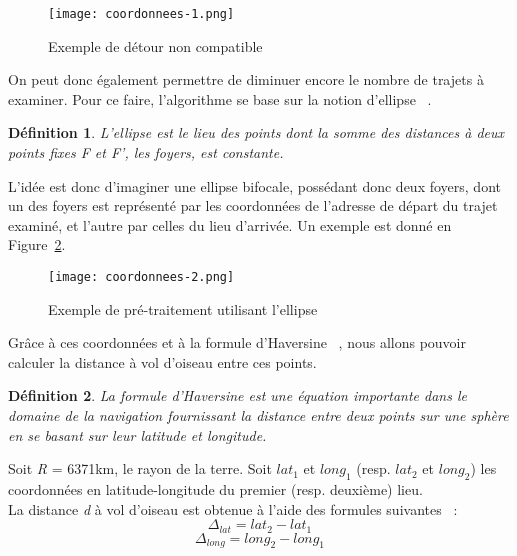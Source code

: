\documentclass[12pt, a4paper, oneside]{article}
\newtheorem{defi}{D\'efinition}[section]
\begin{document}
    \begin{figure}[!htb]
        \begin{center}
         \texttt{[image: coordonnees-1.png]}
         \caption{Exemple de détour non compatible}
         \label{coordonnees-1}
        \end{center}
       \end{figure}
       On peut donc également permettre de diminuer encore le nombre de trajets à examiner. Pour ce faire, l'algorithme se base sur la notion d'ellipse ~\cite{ellipse}.
    \begin{defi}
        L'ellipse est le lieu des points dont la somme des distances à deux points fixes F et F', les foyers, est constante.
    \end{defi}
     L'idée est donc d'imaginer une ellipse bifocale, possédant donc deux foyers, dont un des foyers est représenté par les coordonnées de l'adresse de départ du trajet examiné, et l'autre par celles du lieu d'arrivée. Un exemple est donné en Figure~\ref{coordonnees-2}.
     \begin{figure}[!htb]
      \begin{center}
       \texttt{[image: coordonnees-2.png]}
       \caption{Exemple de pré-traitement utilisant l'ellipse}
       \label{coordonnees-2}
      \end{center}
     \end{figure}
      Grâce à ces coordonnées et à la formule d'Haversine ~\cite{haversine}, nous allons pouvoir calculer la distance à vol d'oiseau entre ces points. 
     \begin{defi}
         La formule d'Haversine est une équation importante dans le domaine de la navigation fournissant la distance entre deux points sur une sphère en se basant sur leur latitude et longitude.
     \end{defi}
     \noindent Soit \textit{R} = 6371km, le rayon de la terre. Soit \textit{$lat_{1}$} et \textit{$long_{1}$} (resp. \textit{$lat_{2}$} et \textit{$long_{2}$}) les coordonnées en latitude-longitude du premier (resp. deuxième) lieu. \\
     La distance \textit{d} à vol d'oiseau est obtenue à l'aide des formules suivantes ~\cite{haversine-script}:
    \begin{equation*}
        \Delta_{lat} = lat_{2} - lat_{1}
    \end{equation*}
    \begin{equation*}
        \Delta_{long} = long_{2} - long_{1}
    \end{equation*}
\end{document}
